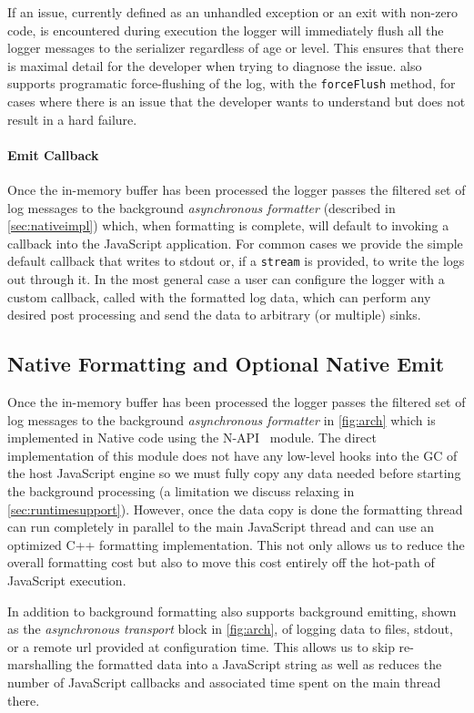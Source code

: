If an issue, currently defined as an unhandled exception or an exit with non-zero code, 
is encountered during execution the logger will immediately flush all the logger 
messages to the serializer regardless of age or level. This ensures that there is maximal 
detail for the developer when trying to diagnose the issue. \projn also supports 
programatic force-flushing of the log, with the \texttt{forceFlush} method, for cases where there 
is an issue that the developer wants to understand but does not result in a hard failure. 

\paragraph{Emit Callback}
\noindent
Once the in-memory buffer has been processed the logger passes the filtered set of 
log messages to the background \emph{asynchronous formatter} (described in \autoref{sec:nativeimpl}) 
which, when formatting is complete, will default to invoking a callback into the 
JavaScript application. For common cases we provide the simple default callback that 
writes to stdout or, if a \texttt{stream} is provided, to write the logs out through 
it. In the most general case a user can configure the logger with a custom callback, 
called with the formatted log data, which can perform any desired post processing and 
send the data to arbitrary (or multiple) sinks.

\subsection{Native Formatting and Optional Native Emit}
\label{sec:nativeimpl}
Once the in-memory buffer has been processed the logger passes the filtered set of 
log messages to the background \emph{asynchronous formatter} in \autoref{fig:arch} which 
is implemented in Native code using the N-API~\cite{NAPI} module. The direct 
implementation of this module does not have any low-level hooks into the GC of 
the host JavaScript engine so we must fully copy any data needed before starting 
the background processing (a limitation we discuss relaxing in \autoref{sec:runtimesupport}). 
However, once the data copy is done the formatting thread can run completely in parallel 
to the main JavaScript thread and can use an optimized C++ formatting implementation. This 
not only allows us to reduce the overall formatting cost but also to move this cost 
entirely off the hot-path of JavaScript execution.

In addition to background formatting \projn also supports background emitting, 
shown as the \emph{asynchronous transport} block in \autoref{fig:arch}, of 
logging data to files, stdout, or a remote url provided at configuration time. This 
allows us to skip re-marshalling the formatted data into a JavaScript string as well 
as reduces the number of JavaScript callbacks and associated time spent on the 
main thread there. 

